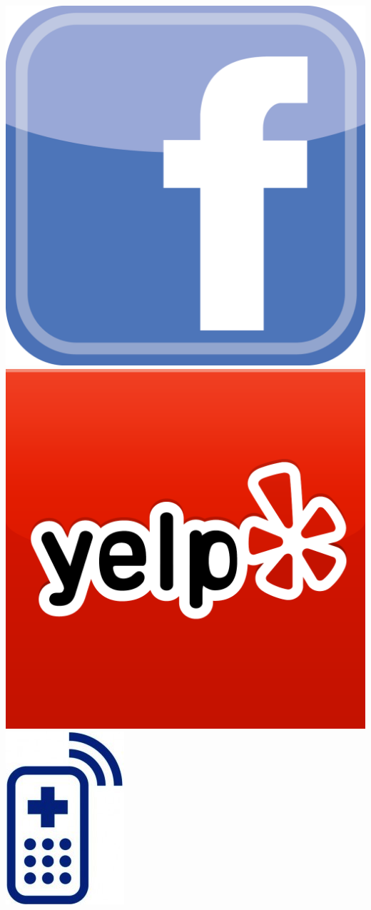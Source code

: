 \documentclass[a2,landscape]{a0poster}
\begin{document}
\includegraphics[scale=0.3]{plots/logo_facebook}
\includegraphics[scale=0.08]{plots/logo_yelp}
\includegraphics[scale=0.4]{plots/logo_mhealth}\\
\end{document}
